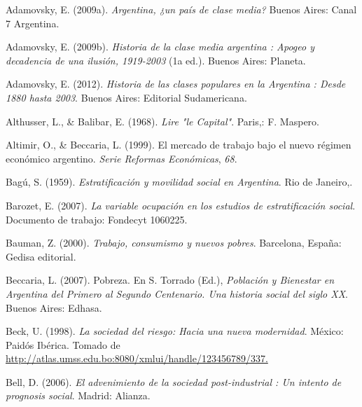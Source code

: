\documentclass[
]{article}
\newlength{\cslhangindent}
\newlength{\cslentryspacingunit} %
\newenvironment{CSLReferences}[2] %
 {%
  \setlength{\parindent}{0pt}
  \ifodd #1
  \let\oldpar\par
  \def\par{\hangindent=\cslhangindent\oldpar}
  \fi
  \setlength{\parskip}{#2\cslentryspacingunit}
 }%
 {}
\begin{document}
\hypertarget{refs}{}
\begin{CSLReferences}{1}{0}
\leavevmode{}%
Adamovsky, E. (2009a). \emph{Argentina, ¿un país de clase media?} Buenos Aires: Canal 7 Argentina.

\leavevmode{}%
Adamovsky, E. (2009b). \emph{Historia de la clase media argentina : Apogeo y decadencia de una ilusión, 1919-2003} (1a ed.). Buenos Aires: Planeta.

\leavevmode{}%
Adamovsky, E. (2012). \emph{Historia de las clases populares en la {Argentina} : Desde 1880 hasta 2003}. Buenos Aires: Editorial Sudamericana.

\leavevmode{}%
Althusser, L., \& Balibar, E. (1968). \emph{Lire "le {Capital}"}. Paris,: F. Maspero.

\leavevmode{}%
Altimir, O., \& Beccaria, L. (1999). El mercado de trabajo bajo el nuevo régimen económico argentino. \emph{Serie Reformas Económicas}, \emph{68}.

\leavevmode{}%
Bagú, S. (1959). \emph{Estratificación y movilidad social en {Argentina}}. Rio de Janeiro,.

\leavevmode{}%
Barozet, E. (2007). \emph{La variable ocupación en los estudios de estratificación social}. Documento de trabajo: Fondecyt 1060225.

\leavevmode{}%
Bauman, Z. (2000). \emph{Trabajo, consumismo y nuevos pobres}. Barcelona, España: Gedisa editorial.

\leavevmode{}%
Beccaria, L. (2007). Pobreza. En S. Torrado (Ed.), \emph{Población y {Bienestar} en {Argentina} del {Primero} al {Segundo} {Centenario}. {Una} historia social del siglo {XX}}. Buenos Aires: Edhasa.

\leavevmode{}%
Beck, U. (1998). \emph{La sociedad del riesgo: Hacia una nueva modernidad}. México: Paidós Ibérica. Tomado de \href{http://atlas.umss.edu.bo:8080/xmlui/handle/123456789/337}{http://atlas.umss.edu.bo:8080/xmlui/handle/123456789/337.}

\leavevmode{}%
Bell, D. (2006). \emph{El advenimiento de la sociedad post-industrial : Un intento de prognosis social}. Madrid: Alianza.


\end{CSLReferences}
\end{document}
